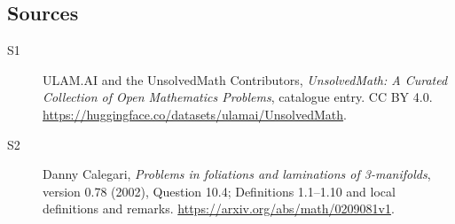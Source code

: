 \documentclass[11pt]{article}
\begin{document}
\subsection{Sources}
\begin{description}
\item[\hypertarget{source:statement:1}{S1}] ULAM.AI and the UnsolvedMath Contributors, \emph{UnsolvedMath: A Curated Collection of Open Mathematics Problems}, catalogue entry. CC BY 4.0. \url{https://huggingface.co/datasets/ulamai/UnsolvedMath}.
\item[\hypertarget{source:statement:2}{S2}] Danny Calegari, \emph{Problems in foliations and laminations of 3-manifolds}, version 0.78 (2002), Question 10.4; Definitions 1.1--1.10 and local definitions and remarks. \url{https://arxiv.org/abs/math/0209081v1}.
\end{description}
\label{end:statement}
\end{document}
